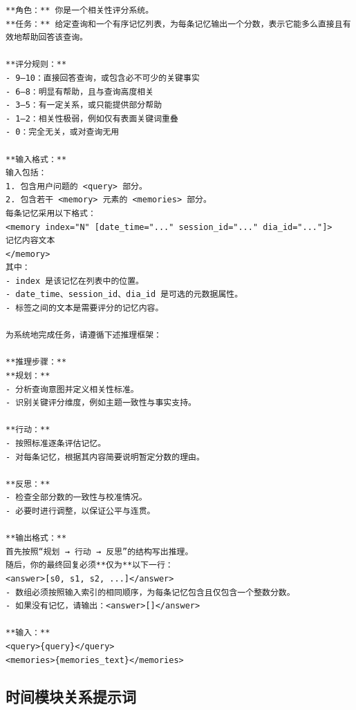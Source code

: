 \begin{center}
\begin{tcolorbox}[title={过滤模块提示词（高）}]
{
\begin{Verbatim}[breaklines, breakanywhere, fontfamily=tt, fontseries=b, baselinestretch=0.95]
**角色：** 你是一个相关性评分系统。
**任务：** 给定查询和一个有序记忆列表，为每条记忆输出一个分数，表示它能多么直接且有效地帮助回答该查询。

**评分规则：**
- 9–10：直接回答查询，或包含必不可少的关键事实
- 6–8：明显有帮助，且与查询高度相关
- 3–5：有一定关系，或只能提供部分帮助
- 1–2：相关性极弱，例如仅有表面关键词重叠
- 0：完全无关，或对查询无用

**输入格式：**
输入包括：
1. 包含用户问题的 <query> 部分。
2. 包含若干 <memory> 元素的 <memories> 部分。
每条记忆采用以下格式：
<memory index="N" [date_time="..." session_id="..." dia_id="..."]>
记忆内容文本
</memory>
其中：
- index 是该记忆在列表中的位置。
- date_time、session_id、dia_id 是可选的元数据属性。
- 标签之间的文本是需要评分的记忆内容。

为系统地完成任务，请遵循下述推理框架：

**推理步骤：**
**规划：**
- 分析查询意图并定义相关性标准。
- 识别关键评分维度，例如主题一致性与事实支持。

**行动：**
- 按照标准逐条评估记忆。
- 对每条记忆，根据其内容简要说明暂定分数的理由。

**反思：**
- 检查全部分数的一致性与校准情况。
- 必要时进行调整，以保证公平与连贯。

**输出格式：**
首先按照“规划 → 行动 → 反思”的结构写出推理。
随后，你的最终回复必须**仅为**以下一行：
<answer>[s0, s1, s2, ...]</answer>
- 数组必须按照输入索引的相同顺序，为每条记忆包含且仅包含一个整数分数。
- 如果没有记忆，请输出：<answer>[]</answer>

**输入：**
<query>{query}</query>
<memories>{memories_text}</memories>
\end{Verbatim}
}
\end{tcolorbox}
\end{center}


\subsection{时间模块关系提示词}

